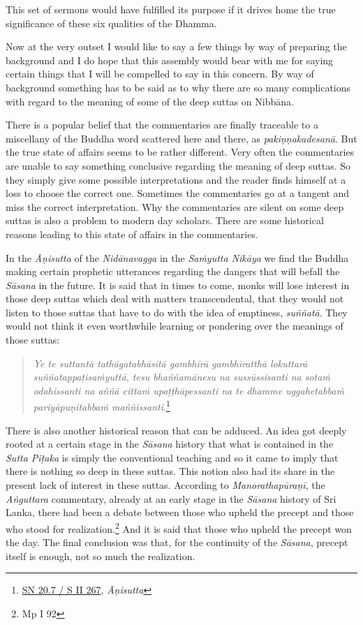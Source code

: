 This set of sermons would have fulfilled its purpose if it drives home the true significance of these six qualities of the Dhamma.

Now at the very outset I would like to say a few things by way of preparing the background and I do hope that this assembly would bear with me for saying certain things that I will be compelled to say in this concern. By way of background something has to be said as to why there are so many complications with regard to the meaning of some of the deep suttas on Nibbāna.

There is a popular belief that the commentaries are finally traceable to a miscellany of the Buddha word scattered here and there, as \emph{pakiṇṇakadesanā}. But the true state of affairs seems to be rather different. Very often the commentaries are unable to say something conclusive regarding the meaning of deep suttas. So they simply give some possible interpretations and the reader finds himself at a loss to choose the correct one. Sometimes the commentaries go at a tangent and miss the correct interpretation. Why the commentaries are silent on some deep suttas is also a problem to modern day scholars. There are some historical reasons leading to this state of affairs in the commentaries.

In the \emph{Āṇisutta} of the \emph{Nidānavagga} in the \emph{Saṁyutta Nikāya} we find the Buddha making certain prophetic utterances regarding the dangers that will befall the \emph{Sāsana} in the future. It is said that in times to come, monks will lose interest in those deep suttas which deal with matters transcendental, that they would not listen to those suttas that have to do with the idea of emptiness, \emph{suññatā}. They would not think it even worthwhile learning or pondering over the meanings of those suttas:

\begin{quote}
\emph{Ye te suttantā tathāgatabhāsitā gambhīrā gambhīratthā lokuttarā suññatappaṭisaṁyuttā, tesu bhaññamānesu na sussūssisanti na sotaṁ odahissanti na aññā cittaṁ upaṭṭhāpessanti na te dhamme uggahetabbaṁ pariyāpuṇitabbaṁ maññissanti}.\footnote{\href{https://suttacentral.net/sn20.7/pli/ms}{SN 20.7 / S II 267}, \emph{Āṇisutta}}
\end{quote}

There is also another historical reason that can be adduced. An idea got deeply rooted at a certain stage in the \emph{Sāsana} history that what is contained in the \emph{Sutta Piṭaka} is simply the conventional teaching and so it came to imply that there is nothing so deep in these suttas. This notion also had its share in the present lack of interest in these suttas. According to \emph{Manorathapūraṇī}, the \emph{Aṅguttara} commentary, already at an early stage in the \emph{Sāsana} history of Sri Lanka, there had been a debate between those who upheld the precept and those who stood for realization.\footnote{Mp I 92} And it is said that those who upheld the precept won the day. The final conclusion was that, for the continuity of the \emph{Sāsana}, precept itself is enough, not so much the realization.

